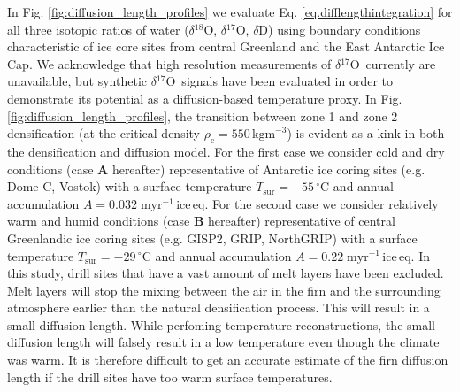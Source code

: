 \documentclass[11pt, draftcls, onecolumn]{IEEEtran} %
\numberwithin{equation}{section}
\numberwithin{table}{section}
\numberwithin{figure}{section}
\newcommand{\delOx}{$\delta{}^{18}\mathrm{O}$}
\newcommand{\delOxb}{$\delta{}^{17}\mathrm{O}$}
\newcommand{\delD}{$\delta\mathrm{D}$}
\begin{document}

In Fig. \ref{fig:diffusion_length_profiles} we evaluate Eq. \ref{eq.difflengthintegration} for all three isotopic ratios 
of water (\delOx, \delOxb, \delD) using boundary conditions characteristic of ice core sites from central Greenland
and the East Antarctic Ice Cap.
We acknowledge that high resolution measurements of \delOxb~currently are unavailable, 
but synthetic \delOxb~signals have been evaluated in order to demonstrate its potential as a diffusion-based temperature proxy.
In Fig. \ref{fig:diffusion_length_profiles},
the transition between zone 1 and zone 2 densification (at the critical density $\rho_\mathrm{c} = 550\, \mathrm{kg m}^{-3}$) is 
evident as a kink in both the densification and diffusion model.
For the first case we consider cold and dry conditions (case \textbf{A} hereafter)
representative of Antarctic ice coring sites
(e.g. Dome C, Vostok) with a surface temperature $T_{\mathrm{sur}} = -55 \,^{\circ} \mathrm{C}$ and 
annual accumulation $A = 0.032 \;\mathrm{myr^{-1}\, ice\, eq.}$
For the second case we consider relatively warm and humid conditions (case \textbf{B} hereafter)
representative of central Greenlandic ice coring sites
(e.g. GISP2, GRIP, NorthGRIP) with a surface temperature $T_{\mathrm{sur}} = -29 \,^{\circ} \mathrm{C}$ and 
annual accumulation $A = 0.22 \;\mathrm{myr^{-1}\, ice\, eq.}$
In this study, drill sites that have a vast amount of melt layers have been excluded. 
Melt layers will stop the mixing between the air in the firn and the surrounding atmosphere earlier than the natural densification process. 
This will result in a small diffusion length. 
While perfoming temperature reconstructions, the small diffusion length will falsely result in a low temperature even though the climate was warm.
It is therefore difficult to get an accurate estimate of the firn diffusion length if the drill sites have too warm surface temperatures.
\end{document}
